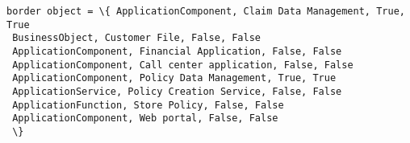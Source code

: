 \documentclass[11pt]{article}
\begin{document}
\begin{Verbatim}[commandchars=\\\{\}]
border object = \{ ApplicationComponent, Claim Data Management, True, True 
 BusinessObject, Customer File, False, False 
 ApplicationComponent, Financial Application, False, False 
 ApplicationComponent, Call center application, False, False 
 ApplicationComponent, Policy Data Management, True, True 
 ApplicationService, Policy Creation Service, False, False 
 ApplicationFunction, Store Policy, False, False 
 ApplicationComponent, Web portal, False, False 
 \} 


    \end{Verbatim}


    
    
    
    
\end{document}

